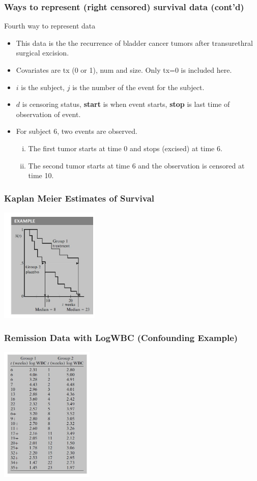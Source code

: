 \documentclass{beamer}
\theoremstyle{definition}
\begin{document}
\begin{frame}
\frametitle{Ways to represent (right censored) survival data (cont'd)}
\begin{block}{Fourth way to represent data }
\begin{itemize}
\item This data is the the recurrence of bladder cancer tumors after transurethral surgical excision.
\item Covariates are tx (0 or 1), num and size. Only tx=0 is included here.
\item $i$ is the subject, $j$ is the number of the event for the subject.
\item $d$ is censoring status, \textbf{start} is when event starts, \textbf{stop} is last time of observation of event.
\item For subject 6, two events are observed.
\begin{enumerate}[i.]
\item The first tumor starts at time 0 and stops (excised) at time 6.
\item The second tumor starts at time 6 and the observation is censored at time 10.
\end{enumerate}
\end{itemize}
\end{block}
\end{frame}

\begin{frame} 
\frametitle{Kaplan Meier Estimates of Survival} 
 \includegraphics[width =\textwidth, height=5.5cm]{Ch1_estsurv.JPG}
 \end{frame} 

\begin{frame} 
\frametitle{Remission Data with LogWBC (Confounding Example)} 
 \includegraphics[width =\textwidth, height=6.5cm]{Ch1-RemissionwLogwbc.JPG}
 \end{frame}  
 
\end{document}
